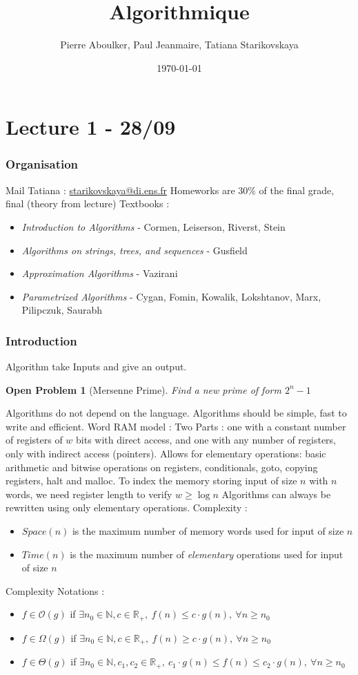 \documentclass{cours}
\title{Algorithmique}
\author{Pierre Aboulker, Paul Jeanmaire, Tatiana Starikovskaya}
\date{\today}
\newtheorem{openpb}{Open Problem}
\begin{document}
\part[First Algorithms]{Lecture 1 - 28/09}
\localtableofcontents
\section{Organisation}
Mail Tatiana : \url{starikovskaya@di.ens.fr}
Homeworks are 30\% of the final grade, final (theory from lecture)
Textbooks :
\begin{itemize}
    \item \textsl{Introduction to Algorithms} - Cormen, Leiserson, Riverst, Stein
    \item \textsl{Algorithms on strings, trees, and sequences} - Gusfield
    \item \textsl{Approximation Algorithms} - Vazirani
    \item \textsl{Parametrized Algorithms} - Cygan, Fomin, Kowalik, Lokshtanov, Marx, Pilipczuk, Saurabh
\end{itemize}

\section{Introduction}
Algorithm take Inputs and give an output.
\begin{openpb}[Mersenne Prime]
    Find a new prime of form $2^{n} - 1$
\end{openpb}
Algorithms do not depend on the language. Algorithms should be simple, fast to write and efficient.
Word RAM model : Two Parts : one with a constant number of registers of $w$ bits with direct access, and one with any number of registers, only with indirect access (pointers).
Allows for elementary operations: basic arithmetic and bitwise operations on registers, conditionals, goto, copying registers, halt and malloc.
To index the memory storing input of size $n$ with $n$ words, we need register length to verify $w \geq \log n$
Algorithms can always be rewritten using only elementary operations.
Complexity :
\begin{itemize}
    \item $Space(n)$ is the maximum number of memory words used for input of size $n$
    \item $Time(n)$ is the maximum number of \textsl{elementary} operations used for input of size $n$
\end{itemize}
Complexity Notations :
\begin{itemize}
    \item $f \in \mathcal{O}(g)$ if $\exists n_0 \in \mathbb{N}, c \in \mathbb{R}_{+},\ f(n) \leq c \cdot g(n), \ \forall n \geq n_0$
    \item $f \in \Omega(g)$ if $\exists n_0 \in \mathbb{N}, c \in \mathbb{R}_{+},\ f(n) \geq c \cdot g(n), \ \forall n \geq n_0$
    \item $f \in \Theta(g)$ if $\exists n_0 \in \mathbb{N}, c_{1}, c_{2} \in \mathbb{R}_{+},\ c_{1} \cdot g(n) \leq f(n) \leq c_{2} \cdot g(n), \ \forall n \geq n_0$
\end{itemize}
\end{document}
